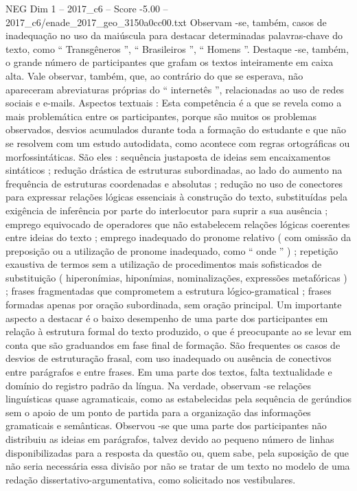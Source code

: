 \begin{textsample}{NEG Dim 1 – 2017\_c6 – Score -5.00 – 2017\_c6/enade\_2017\_geo\_3150a0cc00.txt}
Observam -se, também, casos de inadequação no uso da maiúscula para destacar determinadas palavras-chave do texto, como “ Transgêneros ”, “ Brasileiros ”, “ Homens ”.
Destaque -se, também, o grande número de participantes que grafam os textos inteiramente em caixa alta.
Vale observar, também, que, ao contrário do que se esperava, não apareceram abreviaturas próprias do “ internetês ”, relacionadas ao uso de redes sociais e e-mails.
Aspectos textuais : Esta competência é a que se revela como a mais problemática entre os participantes, porque são muitos os problemas observados, desvios acumulados durante toda a formação do estudante e que não se resolvem com um estudo autodidata, como acontece com regras ortográficas ou morfossintáticas.
São eles : sequência justaposta de ideias sem encaixamentos sintáticos ; redução drástica de estruturas subordinadas, ao lado do aumento na frequência de estruturas coordenadas e absolutas ; redução no uso de conectores para expressar relações lógicas essenciais à construção do texto, substituídas pela exigência de inferência por parte do interlocutor para suprir a sua ausência ; emprego equivocado de operadores que não estabelecem relações lógicas coerentes entre ideias do texto ; emprego inadequado do pronome relativo ( com omissão da preposição ou a utilização de pronome inadequado, como “ onde ” ) ; repetição exaustiva de termos sem a utilização de procedimentos mais sofisticados de substituição ( hiperonímias, hiponímias, nominalizações, expressões metafóricas ) ; frases fragmentadas que comprometem a estrutura lógico-gramatical ; frases formadas apenas por oração subordinada, sem oração principal.
Um importante aspecto a destacar é o baixo desempenho de uma parte dos participantes em relação à estrutura formal do texto produzido, o que é preocupante ao se levar em conta que são graduandos em fase final de formação.
São frequentes os casos de desvios de estruturação frasal, com uso inadequado ou ausência de conectivos entre parágrafos e entre frases.
Em uma parte dos textos, falta textualidade e domínio do registro padrão da língua.
Na verdade, observam -se relações linguísticas quase agramaticais, como as estabelecidas pela sequência de gerúndios sem o apoio de um ponto de partida para a organização das informações gramaticais e semânticas.
Observou -se que uma parte dos participantes não distribuiu as ideias em parágrafos, talvez devido ao pequeno número de linhas disponibilizadas para a resposta da questão ou, quem sabe, pela suposição de que não seria necessária essa divisão por não se tratar de um texto no modelo de uma redação dissertativo-argumentativa, como solicitado nos vestibulares.

\end{textsample}
